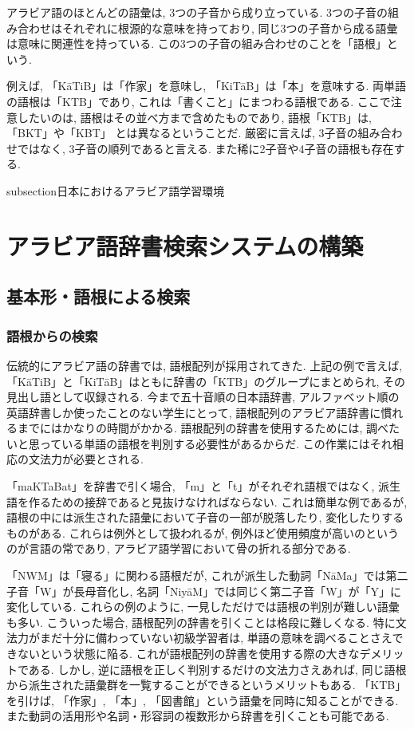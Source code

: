 \documentclass[technicalreport]{ieicej}
\begin{document}
アラビア語のほとんどの語彙は, 3つの子音から成り立っている. 3つの子音の組み合わせはそれぞれに根源的な意味を持っており, 同じ3つの子音から成る語彙は意味に関連性を持っている. この3つの子音の組み合わせのことを「語根」という. 

例えば, 「KāTiB」は「作家」を意味し, 「KiTāB」は「本」を意味する. 両単語の語根は「KTB」であり, これは「書くこと」にまつわる語根である. ここで注意したいのは, 語根はその並べ方まで含めたものであり, 語根「KTB」は, 「BKT」や「KBT」 とは異なるということだ. 厳密に言えば, 3子音の組み合わせではなく, 3子音の順列であると言える. また稀に2子音や4子音の語根も存在する. 

subsection{日本におけるアラビア語学習環境}

\section{アラビア語辞書検索システムの構築}
\subsection{基本形・語根による検索}
\subsubsection{語根からの検索}
伝統的にアラビア語の辞書では, 語根配列が採用されてきた. 上記の例で言えば, 「KāTiB」と「KiTāB」はともに辞書の「KTB」のグループにまとめられ, その見出し語として収録される. 今まで五十音順の日本語辞書, アルファベット順の英語辞書しか使ったことのない学生にとって, 語根配列のアラビア語辞書に慣れるまでにはかなりの時間がかかる. 語根配列の辞書を使用するためには, 調べたいと思っている単語の語根を判別する必要性があるからだ. この作業にはそれ相応の文法力が必要とされる. 

「maKTaBat」を辞書で引く場合, 「m」と「t」がそれぞれ語根ではなく, 派生語を作るための接辞であると見抜けなければならない. これは簡単な例であるが, 語根の中には派生された語彙において子音の一部が脱落したり, 変化したりするものがある. これらは例外として扱われるが, 例外ほど使用頻度が高いのというのが言語の常であり, アラビア語学習において骨の折れる部分である. 

「NWM」は「寝る」に関わる語根だが, これが派生した動詞「NāMa」では第二子音「W」が長母音化し, 名詞「NiyāM」では同じく第二子音「W」が「Y」に変化している. これらの例のように, 一見しただけでは語根の判別が難しい語彙も多い. こういった場合, 語根配列の辞書を引くことは格段に難しくなる. 特に文法力がまだ十分に備わっていない初級学習者は, 単語の意味を調べることさえできないという状態に陥る. これが語根配列の辞書を使用する際の大きなデメリットである. 
しかし, 逆に語根を正しく判別するだけの文法力さえあれば, 同じ語根から派生された語彙群を一覧することができるというメリットもある.  「KTB」を引けば, 「作家」, 「本」, 「図書館」という語彙を同時に知ることができる. また動詞の活用形や名詞・形容詞の複数形から辞書を引くことも可能である. 
\end{document}
